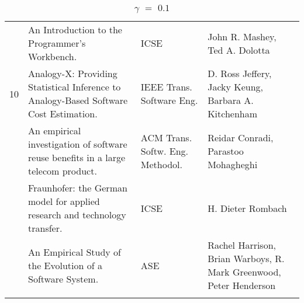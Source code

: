 \begin{center}
\begin{longtable}{|p{}p{}p{}p{}|}
\rowcolor{black!20}	& An Introduction to the Programmer's Workbench.& ICSE& John R. Mashey, Ted 
A. Dolotta \\
    10	& Analogy-X: Providing Statistical Inference to Analogy-Based Software Cost Estimation.& 
IEEE Trans. Software Eng.& D. Ross Jeffery, Jacky Keung, Barbara A. Kitchenham \\
\rowcolor{black!20}	& An empirical investigation of software reuse benefits in a large telecom 
product.& ACM Trans. Softw. Eng. Methodol.& Reidar Conradi, Parastoo Mohagheghi \\
	& Fraunhofer: the German model for applied research and technology transfer.& ICSE& H. 
Dieter Rombach \\
\rowcolor{black!20}	& An Empirical Study of the Evolution of a Software System.& ASE& Rachel 
Harrison, Brian Warboys, R. Mark Greenwood, Peter Henderson \\
    \hline
    \caption {$\gamma$ $=$ $0.1$}
\end{longtable}
\end{center}